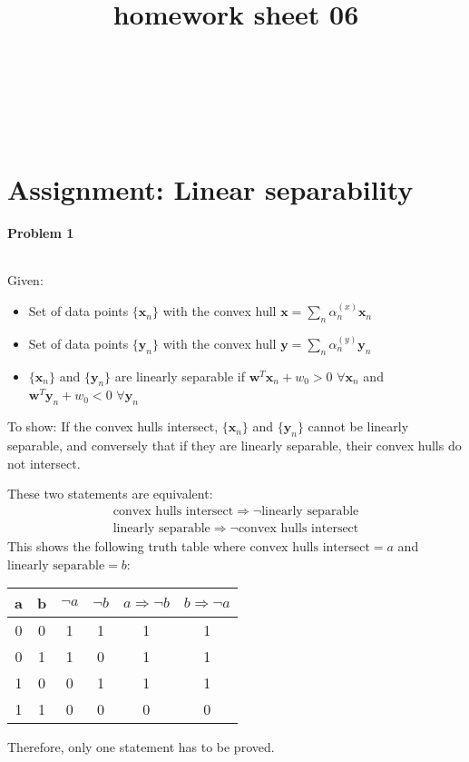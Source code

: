 \documentclass{article}
\title{homework sheet 06}
\author{
\name{Andre Seitz}\\
\imat{03622870}\\
\email{andre.seitz@mytum.de}
\And
\name{Linda Leidig} \\
\imat{03608416}\\
\email{linda.leidig@tum.de}
}
\renewcommand{\Vec}[1]{\ensuremath{\mathbf{#1}}}
\begin{document}
\maketitle

\section{Assignment: Linear separability}
\paragraph*{Problem 1}
$\;$ 

Given:
\begin{itemize}
\item Set of data points $\{\Vec{x}_n\}$ with the convex hull $\Vec{x} = \sum_n \alpha^{(x)}_n \Vec{x}_n$
\item Set of data points $\{\Vec{y}_n\}$ with the convex hull $\Vec{y} = \sum_n \alpha^{(y)}_n \Vec{y}_n$
\item $\{\Vec{x}_n\}$ and $\{\Vec{y}_n\}$ are linearly separable if $\Vec{w}^T \Vec{x}_n + w_0 > 0$  $\forall \Vec{x}_n$ and $\Vec{w}^T \Vec{y}_n + w_0 < 0$ $\forall \Vec{y}_n$
\end{itemize}

To show: If the convex hulls intersect, $\{\Vec{x}_n\}$ and $\{\Vec{y}_n\}$ cannot be linearly separable, and conversely that if they are linearly separable, their convex hulls do not intersect.

These two statements are equivalent:
\begin{eqnarray}
\text{convex hulls intersect} \Rightarrow \neg \text{linearly separable}\\
\text{linearly separable} \Rightarrow \neg \text{convex hulls intersect}
\end{eqnarray}
This shows the following truth table where $\text{convex hulls intersect} = a$ and $\text{linearly separable} = b$:

\begin{table}[h]
\centering
\begin{tabular}{c|c||c|c|c|c}
\textbf{a} & \textbf{b} & \textbf{$\neg a$} & \textbf{$\neg b$} & \textbf{$a \Rightarrow \neg b$} & \textbf{$b \Rightarrow \neg a$}\\
\hline
0&0&1&1&1&1\\
0&1&1&0&1&1\\
1&0&0&1&1&1\\
1&1&0&0&0&0

\end{tabular}
\end{table}
Therefore, only one statement has to be proved.
\end{document}

